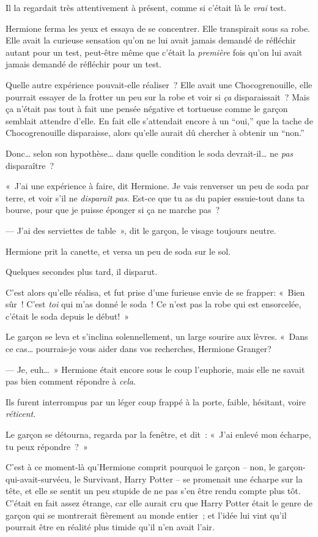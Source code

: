 Il la regardait très attentivement à présent, comme si c'était là le \emph{vrai} test.

Hermione ferma les yeux et essaya de se concentrer.
Elle transpirait sous sa robe.
Elle avait la curieuse sensation qu'on ne lui avait jamais demandé de réfléchir autant pour un test, peut-être même que c'était la \emph{première} fois qu'on lui avait jamais demandé de réfléchir pour un test.

Quelle autre expérience pouvait-elle réaliser~?
Elle avait une Chocogrenouille, elle pourrait essayer de la frotter un peu sur la robe et voir si \emph{ça} disparaissait~?
Mais ça n'était pas tout à fait une pensée négative et tortueuse comme le garçon semblait attendre d'elle.
En fait elle s'attendait encore à un “oui,” que la tache de Chocogrenouille disparaisse, alors qu'elle aurait dû chercher à obtenir un “non.”

Donc… selon son hypothèse… dans quelle condition le soda devrait-il… ne \emph{pas} disparaître~?

«~J'ai une expérience à faire, dit Hermione.
Je vais renverser un peu de soda par terre, et voir s'il ne \emph{disparaît pas}.
Est-ce que tu as du papier essuie-tout dans ta bourse, pour que je puisse éponger si ça ne marche pas~?

--- J'ai des serviettes de table~», dit le garçon, le visage toujours neutre.

Hermione prit la canette, et versa un peu de soda sur le sol.

Quelques secondes plus tard, il disparut.

C'est alors qu'elle réalisa, et fut prise d'une furieuse envie de se frapper:
«~Bien sûr~! C'est \emph{toi } qui m'as donné le soda~!
Ce n'est pas la robe qui est ensorcelée, c'était le soda depuis le début!~»

Le garçon se leva et s'inclina solennellement, un large sourire aux lèvres.
«~Dans ce cas… pourrais-je vous aider dans vos recherches, Hermione Granger?

--- Je, euh…~» Hermione était encore sous le coup l'euphorie, mais elle ne savait pas bien comment répondre à \emph{cela}.

Ils furent interrompus par un léger coup frappé à la porte, faible, hésitant, voire \emph{réticent}.

Le garçon se détourna, regarda par la fenêtre, et dit~: «~J'ai enlevé mon écharpe, tu peux répondre~?~»

C'est à ce moment-là qu'Hermione comprit pourquoi le garçon -- non, le garçon-qui-avait-survécu, le Survivant, Harry Potter -- se promenait une écharpe sur la tête, et elle se sentit un peu stupide de ne pas s'en être rendu compte plus tôt.
C'était en fait assez étrange, car elle aurait cru que Harry Potter était le genre de garçon qui se montrerait fièrement au monde entier~; et l'idée lui vint qu'il pourrait être en réalité plus timide qu'il n'en avait l'air.

